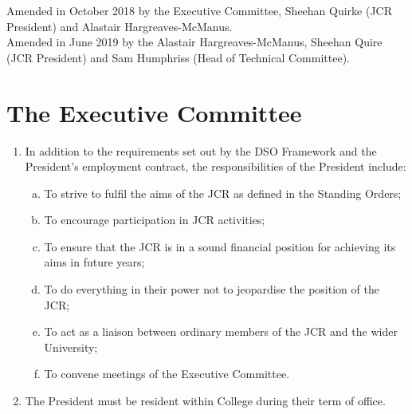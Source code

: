\documentclass[12pt]{article}  %
\begin{document}
Amended in October 2018 by the Executive Committee, Sheehan Quirke (JCR President) and Alastair Hargreaves-McManus.\\
Amended in June 2019 by the Alastair Hargreaves-McManus, Sheehan Quire (JCR President) and Sam Humphriss (Head of Technical Committee).
\newpage
\tableofcontents{}
\newpage


\section{The Executive Committee}
\begin{enumerate}
    \subsection{The President}
    \item In addition to the requirements set out by the DSO Framework and the President’s employment contract, the responsibilities of the President include:
    \begin{enumerate}[(a)]
        \item To strive to fulfil the aims of the JCR as defined in the Standing Orders;
        \item To encourage participation in JCR activities;
        \item To ensure that the JCR is in a sound financial position for achieving its aims in future years;
        \item To do everything in their power not to jeopardise the position of the JCR;
        \item To act as a liaison between ordinary members of the JCR and the wider University;
        \item To convene meetings of the Executive Committee.
    \end{enumerate}
    \item The President must be resident within College during their term of office.

\end{enumerate}
\end{document}
